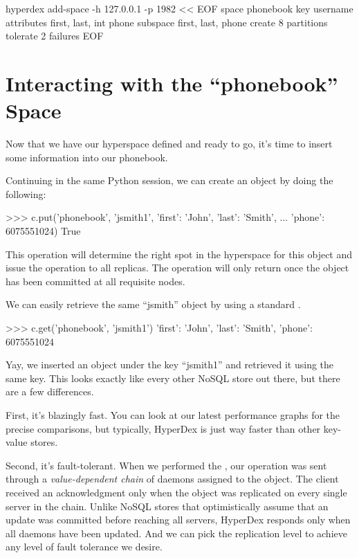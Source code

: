 \begin{consolecode}
hyperdex add-space -h 127.0.0.1 -p 1982 << EOF
   space phonebook
   key username
   attributes first, last, int phone
   subspace first, last, phone
   create 8 partitions
   tolerate 2 failures
EOF
\end{consolecode}

\section{Interacting with the ``phonebook'' Space}

Now that we have our hyperspace defined and ready to go, it's time to insert
some information into our phonebook.

Continuing in the same Python session, we can create an object by doing the
following:

\begin{pythoncode}
>>> c.put('phonebook', 'jsmith1', {'first': 'John', 'last': 'Smith',
...                                'phone': 6075551024})
True
\end{pythoncode}

This operation will determine the right spot in the hyperspace for this object
and issue the  operation to all replicas.  The operation will only
return once the object has been committed at all requisite nodes.

We can easily retrieve the same ``jsmith'' object by using a standard
.

\begin{pythoncode}
>>> c.get('phonebook', 'jsmith1')
{'first': 'John', 'last': 'Smith', 'phone': 6075551024}
\end{pythoncode}

Yay, we inserted an object under the key ``jsmith1'' and retrieved it using the
same key.  This looks exactly like every other NoSQL store out there, but there
are a few differences.

First, it's blazingly fast. You can look at our latest performance graphs for
the precise comparisons, but typically, HyperDex is just way faster than other
key-value stores.

Second, it's fault-tolerant. When we performed the , our operation was
sent through a {\em value-dependent chain} of daemons assigned to the object.
The client received an acknowledgment only when the object was replicated on
every single server in the chain.  Unlike NoSQL stores that optimistically
assume that an update was committed before reaching all servers, HyperDex
responds only when all daemons have been updated.  And we can pick the
replication level to achieve any level of fault tolerance we desire.

